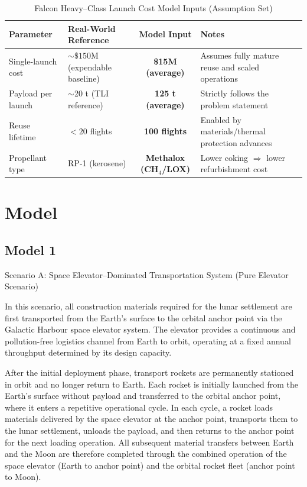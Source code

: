 ﻿\documentclass{mcmthesis}
\begin{document}
\begin{table}[h!]
\centering
\caption{Falcon Heavy--Class Launch Cost Model Inputs (Assumption Set)}
\label{tab:fh_inputs_no_year}
\begin{tabularx}{\textwidth}{@{}l>{\raggedright\arraybackslash}X c >{\raggedright\arraybackslash}X@{}}
\toprule
\textbf{Parameter} & \textbf{Real-World Reference} & \textbf{Model Input} & \textbf{Notes} \\
\midrule
Single-launch cost &
$\sim\$150$M (expendable baseline) &
\textbf{\$15M (average)} &
Assumes fully mature reuse and scaled operations \\

Payload per launch &
$\sim$20 t (TLI reference) &
\textbf{125 t (average)} &
Strictly follows the problem statement \\

Reuse lifetime &
$<20$ flights &
\textbf{100 flights} &
Enabled by materials/thermal protection advances \\

Propellant type &
RP-1 (kerosene) &
\textbf{Methalox (CH$_4$/LOX)} &
Lower coking $\Rightarrow$ lower refurbishment cost \\

\bottomrule
\end{tabularx}
\end{table}

\section{Model}
\subsection{Model 1}
Scenario A: Space Elevator–Dominated Transportation System (Pure Elevator Scenario)

In this scenario, all construction materials required for the lunar settlement are first transported from the Earth’s surface to the orbital anchor point via the Galactic Harbour space elevator system. The elevator provides a continuous and pollution-free logistics channel from Earth to orbit, operating at a fixed annual throughput determined by its design capacity.

After the initial deployment phase, transport rockets are permanently stationed in orbit and no longer return to Earth. Each rocket is initially launched from the Earth’s surface without payload and transferred to the orbital anchor point, where it enters a repetitive operational cycle. In each cycle, a rocket loads materials delivered by the space elevator at the anchor point, transports them to the lunar settlement, unloads the payload, and then returns to the anchor point for the next loading operation. All subsequent material transfers between Earth and the Moon are therefore completed through the combined operation of the space elevator (Earth to anchor point) and the orbital rocket fleet (anchor point to Moon).
\end{document}
